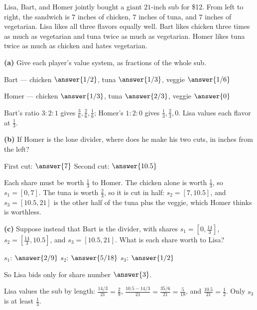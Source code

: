 \documentclass[12pt]{ximera}
\begin{document}
\begin{problem}
Lisa, Bart, and Homer jointly bought a giant $21$-inch sub for \$12. From left to right,
the sandwich is $7$ inches of chicken, $7$ inches of tuna, and $7$ inches of vegetarian.
Lisa likes all three flavors equally well. Bart likes chicken three times as much as
vegetarian and tuna twice as much as vegetarian. Homer likes tuna twice as much as
chicken and hates vegetarian.

\begin{prompt}
\textbf{(a)} Give each player's value system, as fractions of the whole sub.

Bart --- chicken $\answer{1/2}$, tuna $\answer{1/3}$, veggie $\answer{1/6}$

\smallskip
Homer --- chicken $\answer{1/3}$, tuna $\answer{2/3}$, veggie $\answer{0}$
\begin{feedback}
Bart's ratio $3:2:1$ gives $\frac36,\frac26,\frac16$; Homer's $1:2:0$ gives
$\frac13,\frac23,0$. Lisa values each flavor at $\frac13$.
\end{feedback}
\end{prompt}

\begin{prompt}
\textbf{(b)} If Homer is the lone divider, where does he make his two cuts, in inches
from the left?

First cut: $\answer{7}$ \quad Second cut: $\answer{10.5}$
\begin{feedback}
Each share must be worth $\frac13$ to Homer. The chicken alone is worth $\frac13$, so
$s_1=[0,7]$. The tuna is worth $\frac23$, so it is cut in half: $s_2=[7,10.5]$, and
$s_3=[10.5,21]$ is the other half of the tuna plus the veggie, which Homer thinks is
worthless.
\end{feedback}
\end{prompt}

\begin{prompt}
\textbf{(c)} Suppose instead that Bart is the divider, with shares
$s_1=[0,\tfrac{14}3]$, $s_2=[\tfrac{14}3,10.5]$, and $s_3=[10.5,21]$. What is each share
worth to Lisa?

$s_1$: $\answer{2/9}$ \quad $s_2$: $\answer{5/18}$ \quad $s_3$: $\answer{1/2}$

\smallskip
So Lisa bids only for share number $\answer{3}$.
\begin{feedback}
Lisa values the sub by length: $\frac{14/3}{21}=\frac29$,
$\frac{10.5-14/3}{21}=\frac{35/6}{21}=\frac5{18}$, and $\frac{10.5}{21}=\frac12$. Only
$s_3$ is at least $\frac13$.
\end{feedback}
\end{prompt}


\end{problem}
\end{document}
